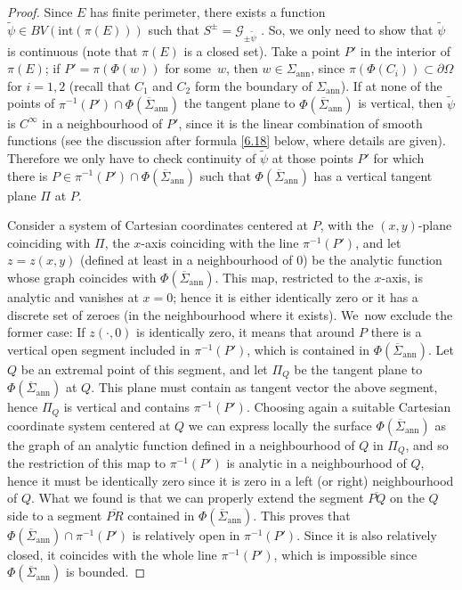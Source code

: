 \documentclass[JEP,XML,SOM,Unicode, NoFloatCountersInSection,published]{cedram}
\let\Om\Omega
\let\pointinspace P
\newcommand{\openannulus}{\Sigma_\mathrm{ann}}
\newcommand{\immclosedann}{\Phi({\overline\Sigma}_\mathrm{ann})}
\newcommand{\pointinOm}{P'}
\theoremstyle{definition}
\begin{document}
\begin{proof}
Since $E$ has finite perimeter,
there exists a function $\widetilde \psi\in BV(\mathrm{int}(\pi(E)))$
such that
$
S^\pm=\mathcal G_{\pm\widetilde \psi}$ \cite{CCF}. So,
we only need to show that
$\widetilde\psi$ is continuous (note that $\pi(E)$ is a closed set).
Take a point $\pointinOm$ in the interior of $\pi(E)$; if $\pointinOm
=\pi(\Phi(w))$ for some~$w$, then $w\in \openannulus$, since
$\pi(\Phi(C_i)) \subset \partial \Om$
for $i=1,2$ (recall that $C_1$ and $C_2$ form the boundary of $\openannulus$).
If at none of the points of $\pi^{-1}(\pointinOm)\cap
\immclosedann$ the tangent plane to $\immclosedann$ is vertical,
then $\widetilde\psi$ is $C^\infty$ in a neighbourhood of $\pointinOm$,
since it is the linear combination of smooth functions
(see the discussion after formula \eqref{6.18} below, where details are given).
Therefore we only have to check continuity of $\widetilde\psi$
at those points $\pointinOm$ for which there is $\pointinspace\in
\pi^{-1}(\pointinOm)\cap\immclosedann$ such that
$\immclosedann$ has a vertical tangent plane $\Pi$ at $\pointinspace$.

Consider a system of Cartesian coordinates
centered at $ \pointinspace$, with the $(x,y)$-plane
coinciding with $\Pi$, the $x$-axis coinciding with the line $\pi^{-1}( \pointinOm)$,
and let $z=z(x,y)$ (defined at least in a neighbourhood of $0$) be the analytic function whose graph coincides with $\immclosedann$.
This map, restricted to the $x$-axis, is analytic and
vanishes at $x=0$; hence it is
either identically zero or it
has a discrete set of zeroes (in the neighbourhood where it exists). We~now exclude the former case: If $z(\cdot,0)$ is identically zero,
it means that around $\pointinspace$ there is a vertical open
segment included in $\pi^{-1}(\pointinOm)$,
which is
contained in $\immclosedann$. Let $Q$ be an extremal point of this segment, and
let $\Pi_Q$ be the tangent plane to $\immclosedann$ at $Q$.
This plane must
contain as tangent vector the above segment, hence $\Pi_Q$ is vertical and
contains $\pi^{-1}(\pointinOm)$.
Choosing again a suitable Cartesian coordinate system centered at $Q$
we can express locally
the surface $\immclosedann$ as the graph of an analytic function defined in a
neighbourhood of $Q$ in $\Pi_Q$, and so
the restriction of this map to
$\pi^{-1}(\pointinOm)$ is analytic in a neighbourhood of $Q$,
hence it must be identically zero since it is zero in a
left (or right) neighbourhood of $Q$.
What we found is that we can properly extend the segment $\overline{\pointinspace Q}$
on the $Q$ side to a segment $\overline{PR}$ contained in
$\immclosedann$.
This proves that $\immclosedann\cap \pi^{-1}(\pointinOm)$ is relatively open in $\pi^{-1}(\pointinOm)$. Since it is also relatively closed, it coincides with the whole line $\pi^{-1}(\pointinOm)$, which
is impossible since ${\Phi}(\overline\Sigma_\mathrm{ann})$ is bounded.


\end{proof}
\end{document}
